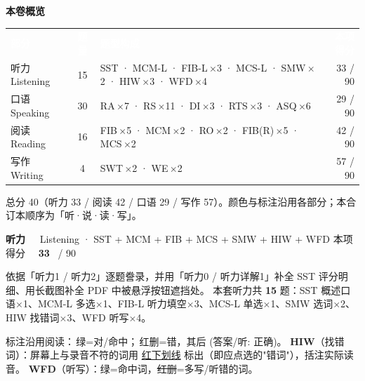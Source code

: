 \documentclass[11pt]{article}
\newcommand{\ptesection}[3]{%
  \addcontentsline{toc}{section}{#1}%
  \needspace{6\baselineskip}
  \begin{tcolorbox}[enhanced, colback=cAccent, colframe=cAccent, sharp corners,
     left=14pt, right=14pt, top=10pt, bottom=10pt, boxrule=0pt]
    {\fontsize{20}{24}\selectfont\bfseries\color{white} #1\ \ }%
    {\large\color{white!85} #2}\hfill
    {\large\color{white}本项得分\ \ }{\fontsize{22}{24}\selectfont\bfseries\color{white} #3}%
    \ {\color{white!85}/ 90}
  \end{tcolorbox}}
\begin{document}
\clearpage
\tableofcontents
\bigskip

{\large\bfseries\color{cAccent}本卷概览}\par\smallskip
{\small
\begin{tabularx}{\linewidth}{@{}l c >{\RaggedRight\arraybackslash}X r@{}}
\rowcolor{cHead}\textcolor{white}{\bfseries 部分} & \textcolor{white}{\bfseries 题量} & \textcolor{white}{\bfseries 题型构成} & \textcolor{white}{\bfseries 本项得分}\\
听力 Listening & 15 & SST · MCM-L · FIB-L\,$\times$3 · MCS-L · SMW\,$\times$2 · HIW\,$\times$3 · WFD\,$\times$4 & 33 / 90\\
口语 Speaking & 30 & RA\,$\times$7 · RS\,$\times$11 · DI\,$\times$3 · RTS\,$\times$3 · ASQ\,$\times$6 & 29 / 90\\
阅读 Reading & 16 & FIB\,$\times$5 · MCM\,$\times$2 · RO\,$\times$2 · FIB(R)\,$\times$5 · MCS\,$\times$2 & 42 / 90\\
写作 Writing & \phantom{0}4 & SWT\,$\times$2 · WE\,$\times$2 & 57 / 90\\
\end{tabularx}}
\par\smallskip
{\footnotesize\color{gray}总分 40（听力 33 / 阅读 42 / 口语 29 / 写作 57）。颜色与标注沿用各部分；本合订本顺序为「听·说·读·写」。}

\clearpage
\ptesection{听力}{Listening · SST + MCM + FIB + MCS + SMW + HIW + WFD}{33}

\vspace{1mm}
{\small\color{gray} 依据「听力1 / 听力2」逐题誊录，并用「听力0 / 听力详解1」补全 SST 评分明细、用长截图补全 PDF 中被悬浮按钮遮挡处。
本套听力共 \textbf{15} 题：SST 概述口语$\times$1、MCM-L 多选$\times$1、FIB-L 听力填空$\times$3、MCS-L 单选$\times$1、SMW 选词$\times$2、HIW 找错词$\times$3、WFD 听写$\times$4。}
\vspace{1mm}

\begin{notebox}
{\footnotesize 标注沿用阅读：{\color{cFix}\,绿=对/命中}；{\color{cWrong}\,红删=错}，其后 {\color{cFix}(答案/听: 正确)}。
\textbf{HIW}（找错词）：屏幕上与录音不符的词用 {\color{cWrong}\uline{红下划线}} 标出（即应点选的"错词"），括注实际读音。
\textbf{WFD}（听写）：{\color{cFix}绿}=命中词，{\color{cWrong}\sout{红删}}=多写/听错的词。}
\end{notebox}
\end{document}
